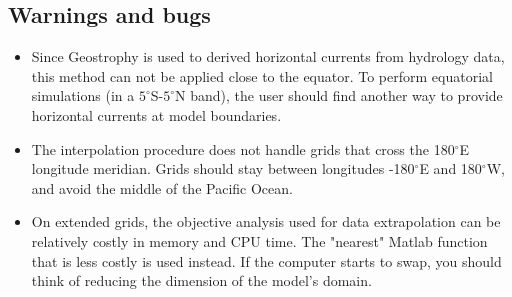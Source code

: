 \subsection{Warnings and bugs}
\begin{itemize}
\item Since Geostrophy is used to derived horizontal currents 
from hydrology data, this method can not be applied close to 
the equator. To perform equatorial simulations (in a 
$5^\circ$S-$5^\circ$N band), the user should find another 
way to provide horizontal currents at model boundaries.
\item The interpolation procedure does not handle grids that cross
the 180$^\circ$E longitude meridian. 
Grids should stay between longitudes -180$^\circ$E and 180$^\circ$W,  
and avoid the middle of the Pacific Ocean.
\item On extended grids, the objective analysis used for data 
extrapolation can be relatively costly in memory and CPU time. 
The "nearest" Matlab function that is less costly is used instead.
If the computer starts to swap, you should think of reducing the 
dimension of the model's domain.
\end{itemize}
